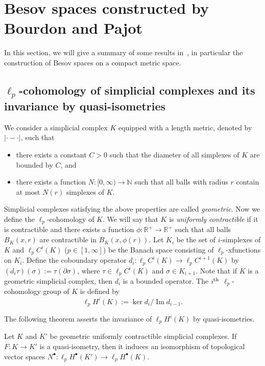 \documentclass[AHL,Unicode,longabstracts,published]{cedram}
\DeclareMathOperator{\Ima}{Im}
\newcommand{\br}{\mathbb{R}}
\newcommand{\bn}{\mathbb{N}}
\begin{document}
\section{Besov spaces constructed by Bourdon and Pajot}\label{besov-bp}
In this section, we will give a summary of some results in~\cite{BP}, in particular the construction of Besov spaces on a compact metric space.

\subsection{\texorpdfstring{$\ell_p$}{lp}-cohomology of simplicial complexes and its invariance by quasi-isometries}

We consider a simplicial complex $K$ equipped with a length metric, denoted by $|\cdot-\cdot|$, such that
\begin{itemize}
\item there exists a constant $C>0$ such that the diameter of all simplexes of $K$ are bounded by $C$, and
\item there exists a function $N:[0,\infty)\rightarrow\bn$ such that all balls with radius $r$ contain at most $N(r)$ simplexes of $K$.
\end{itemize}
Simplicial complexes satisfying the above properties are called \emph{geometric}. Now we define the $\ell_p$-cohomology of $K$. We will say that $K$ is \emph{uniformly contractible} if it is contractible and there exists a function $\phi:\br^{+}\rightarrow\br^{+}$ such that all balls $B_K(x,r)$ are contractible in $B_K(x,\phi(r))$. Let $K_i$ be the set of $i$-simplexes of $K$ and $\ell_pC^i(K)$ ($p\in[1,\infty]$) be the Banach space consisting of $\ell_p$-xfunctions on $K_i$. Define the coboundary operator $d_i:\ell_pC^i(K)\rightarrow\ell_pC^{i+1}(K)$ by $(d_i\tau)(\sigma):=\tau(\partial\sigma)$, where $\tau\in\ell_pC^i(K)$ and $\sigma\in K_{i+1}$. Note that if $K$ is a geometric simplicial complex, then $d_i$ is a bounded operator. The $i^{\rm th}$ $\ell_p$-cohomology group of $K$ is defined by
\begin{equation*}
\ell_pH^i(K):=\ker{d_i}/\Ima d_{i-1}.
\end{equation*}

The following theorem asserts the invariance of $\ell_pH^i(K)$ by quasi-isometries.

\begin{theo}[{\cite[Theorem~1.1]{BP}}]\label{inv}
Let $K$ and $K'$ be geometric uniformly contractible simplicial complexes. If $F:K\rightarrow K'$ is a quasi-isometry, then it induces an isomorphism of topological vector spaces $N^{\bullet}:\ell_pH^{\bullet}(K')\rightarrow\ell_pH^{\bullet}(K)$.
\end{theo}
\end{document}
